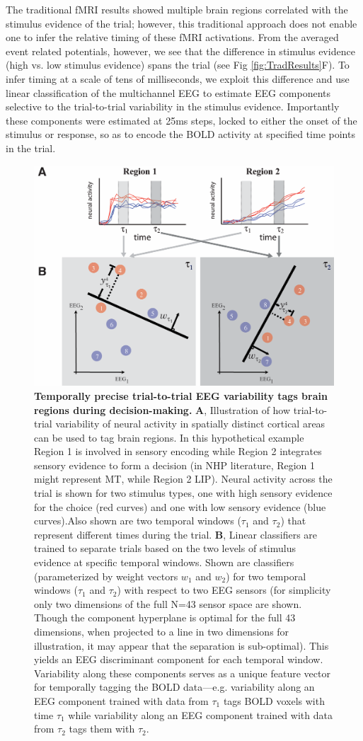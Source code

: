 The traditional fMRI results showed multiple brain regions correlated with the stimulus evidence of the trial; however, this traditional approach does not enable one to infer the relative timing of these fMRI activations. From the averaged event related potentials, however, we see that the difference in stimulus evidence (high vs. low stimulus evidence) spans the trial (see Fig \ref{fig:TradResults}F). To infer timing at a scale of tens of milliseconds, we exploit this difference and use linear classification \cite{Parra2005,Sajda2009} of the multichannel EEG to estimate EEG components selective to the trial-to-trial variability in the stimulus evidence.  Importantly these components were estimated at 25ms steps, locked to either the onset of the stimulus or response, so as to encode the BOLD activity at specified time points in the trial.  
\begin{figure}[tb!]
\centering
\includegraphics[width=.6\textwidth]{Fig3.png}
\caption{\textbf{Temporally precise trial-to-trial EEG variability tags brain regions during decision-making.}
\textbf{A}, Illustration of how trial-to-trial variability of neural activity in spatially distinct cortical areas can be used to tag brain regions. In this hypothetical example Region 1 is involved in sensory encoding while Region 2 integrates sensory evidence to form a decision (in NHP literature, Region 1 might represent MT, while Region 2 LIP). Neural activity across the trial is shown for two stimulus types, one with high sensory evidence for the choice (red curves) and one with low sensory evidence (blue curves).Also shown are two temporal windows ($\tau_{1}$ and $\tau_{2}$) that represent different times during the trial. \textbf{B}, Linear classifiers are trained to separate trials based on the two levels of stimulus evidence at specific temporal windows.  Shown are classifiers (parameterized by weight vectors $w_{1}$ and $w_{2}$) for two temporal windows ($\tau_{1}$ and $\tau_{2}$) with respect to two EEG sensors (for simplicity only two dimensions of the full N=43 sensor space are shown.  Though the component hyperplane is optimal for the full 43 dimensions, when projected to a line in two dimensions for illustration, it may appear that the separation is sub-optimal). This yields an EEG discriminant component for each temporal window. Variability along these components serves as a unique feature vector for temporally tagging the BOLD data—e.g. variability along an EEG component trained with data from $\tau_{1}$ tags BOLD voxels with time $\tau_{1}$ while variability along an EEG component trained with data from $\tau_{2}$ tags them with $\tau_{2}$.}
\label{fig:variability}
\end{figure}

